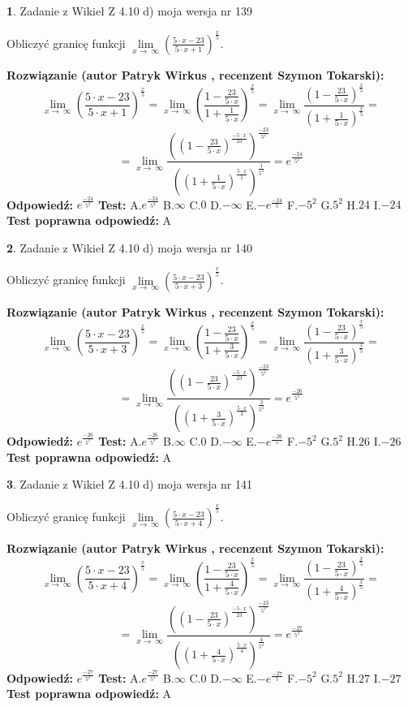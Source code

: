 \documentclass[12pt, a4paper]{article}
\theoremstyle{definition} %
\newtheorem{zad}{}
\newcommand{\zadStart}[1]{\begin{zad}#1\newline}
\newcommand{\zadStop}{\end{zad}}
\newcommand{\rozwStart}[2]{\noindent \textbf{Rozwiązanie (autor #1 , recenzent #2): }\newline}
\newcommand{\rozwStop}{\newline}
\newcommand{\odpStart}{\noindent \textbf{Odpowiedź:}\newline}
\newcommand{\odpStop}{\newline}
\newcommand{\testStart}{\noindent \textbf{Test:}\newline}
\newcommand{\testStop}{\newline}
\newcommand{\kluczStart}{\noindent \textbf{Test poprawna odpowiedź:}\newline}
\newcommand{\kluczStop}{\newline}
\begin{document}
\zadStart{Zadanie z Wikieł Z 4.10 d) moja wersja nr 139}


Obliczyć granicę funkcji  $\lim\limits_{x\to\ \infty}(\frac{5\cdot x-23}{5\cdot x+1})^{\frac{x}{5}}$.
\zadStop
\rozwStart{Patryk Wirkus}{Szymon Tokarski}
$$\lim\limits_{x\to\ \infty}(\frac{5\cdot x-23}{5\cdot x+1})^{\frac{x}{5}} = \lim\limits_{x\to\ \infty}(\frac{1-\frac{23}{5\cdot x}}{1+\frac{1}{5\cdot x}})^{\frac{x}{5}}=\lim\limits_{x\to\ \infty}\frac{(1-\frac{23}{5\cdot x})^{\frac{x}{5}}}{(1+\frac{1}{5\cdot x})^{\frac{x}{5}}}=$$
$$=\lim\limits_{x\to\ \infty}\frac{((1-\frac{23}{5\cdot x})^{\frac{-5\cdot x}{23}})^{\frac{-23}{5^{2}}}}{((1+\frac{1}{5\cdot x})^{\frac{5\cdot x}{1}})^{\frac{1}{5^{2}}}}=e^{\frac{-24}{5^{2}}}$$
\rozwStop
\odpStart
$e^{\frac{-24}{5^{2}}}$
\odpStop
\testStart
A.$e^{\frac{-24}{5^{2}}}$ B.$\infty$ C.$0$ D.$-\infty$ E.$-e^{\frac{-24}{5}}$
F.$-5^{2}$ G.$5^{2}$
H.$24$
I.$-24$
\testStop
\kluczStart
A
\kluczStop



\zadStart{Zadanie z Wikieł Z 4.10 d) moja wersja nr 140}


Obliczyć granicę funkcji  $\lim\limits_{x\to\ \infty}(\frac{5\cdot x-23}{5\cdot x+3})^{\frac{x}{5}}$.
\zadStop
\rozwStart{Patryk Wirkus}{Szymon Tokarski}
$$\lim\limits_{x\to\ \infty}(\frac{5\cdot x-23}{5\cdot x+3})^{\frac{x}{5}} = \lim\limits_{x\to\ \infty}(\frac{1-\frac{23}{5\cdot x}}{1+\frac{3}{5\cdot x}})^{\frac{x}{5}}=\lim\limits_{x\to\ \infty}\frac{(1-\frac{23}{5\cdot x})^{\frac{x}{5}}}{(1+\frac{3}{5\cdot x})^{\frac{x}{5}}}=$$
$$=\lim\limits_{x\to\ \infty}\frac{((1-\frac{23}{5\cdot x})^{\frac{-5\cdot x}{23}})^{\frac{-23}{5^{2}}}}{((1+\frac{3}{5\cdot x})^{\frac{5\cdot x}{3}})^{\frac{3}{5^{2}}}}=e^{\frac{-26}{5^{2}}}$$
\rozwStop
\odpStart
$e^{\frac{-26}{5^{2}}}$
\odpStop
\testStart
A.$e^{\frac{-26}{5^{2}}}$ B.$\infty$ C.$0$ D.$-\infty$ E.$-e^{\frac{-26}{5}}$
F.$-5^{2}$ G.$5^{2}$
H.$26$
I.$-26$
\testStop
\kluczStart
A
\kluczStop



\zadStart{Zadanie z Wikieł Z 4.10 d) moja wersja nr 141}


Obliczyć granicę funkcji  $\lim\limits_{x\to\ \infty}(\frac{5\cdot x-23}{5\cdot x+4})^{\frac{x}{5}}$.
\zadStop
\rozwStart{Patryk Wirkus}{Szymon Tokarski}
$$\lim\limits_{x\to\ \infty}(\frac{5\cdot x-23}{5\cdot x+4})^{\frac{x}{5}} = \lim\limits_{x\to\ \infty}(\frac{1-\frac{23}{5\cdot x}}{1+\frac{4}{5\cdot x}})^{\frac{x}{5}}=\lim\limits_{x\to\ \infty}\frac{(1-\frac{23}{5\cdot x})^{\frac{x}{5}}}{(1+\frac{4}{5\cdot x})^{\frac{x}{5}}}=$$
$$=\lim\limits_{x\to\ \infty}\frac{((1-\frac{23}{5\cdot x})^{\frac{-5\cdot x}{23}})^{\frac{-23}{5^{2}}}}{((1+\frac{4}{5\cdot x})^{\frac{5\cdot x}{4}})^{\frac{4}{5^{2}}}}=e^{\frac{-27}{5^{2}}}$$
\rozwStop
\odpStart
$e^{\frac{-27}{5^{2}}}$
\odpStop
\testStart
A.$e^{\frac{-27}{5^{2}}}$ B.$\infty$ C.$0$ D.$-\infty$ E.$-e^{\frac{-27}{5}}$
F.$-5^{2}$ G.$5^{2}$
H.$27$
I.$-27$
\testStop
\kluczStart
A
\kluczStop
\end{document}
